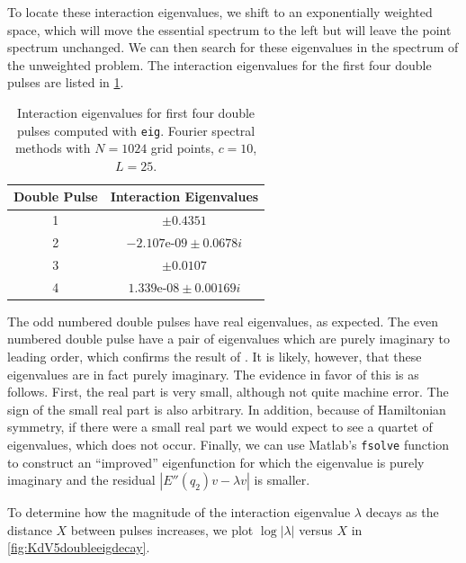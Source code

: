 \documentclass[thesis.tex]{subfiles}
\begin{document}
To locate these interaction eigenvalues, we shift to an exponentially weighted space, which will move the essential spectrum to the left but will leave the point spectrum unchanged. We can then search for these eigenvalues in the spectrum of the unweighted problem. The interaction eigenvalues for the first four double pulses are listed in \cref{table:KdV5inteigs}.

\begin{table}
\centering
\begin{tabular}{|c|c|} 
 \hline
 Double Pulse & Interaction Eigenvalues \\
 \hline
 1 & $\pm 0.4351$ \\
 2 & $-2.107\text{e-}09 \pm 0.0678 i$ \\
 3 & $\pm 0.0107$ \\
 4 & $1.339\text{e-}08 \pm 0.00169 i$ \\
 \hline
\end{tabular}
\caption{Interaction eigenvalues for first four double pulses computed with \texttt{eig}. Fourier spectral methods with $N = 1024$ grid points, $c = 10$, $L = 25$.}
\label{table:KdV5inteigs}
\end{table}

The odd numbered double pulses have real eigenvalues, as expected. The even numbered double pulse have a pair of eigenvalues which are purely imaginary to leading order, which confirms the result of \cite[Theorem 2.3]{Pelinovsky2007}. It is likely, however, that these eigenvalues are in fact purely imaginary. The evidence in favor of this is as follows. First, the real part is very small, although not quite machine error. The sign of the small real part is also arbitrary. In addition, because of Hamiltonian symmetry, if there were a small real part we would expect to see a quartet of eigenvalues, which does not occur. Finally, we can use Matlab's \texttt{fsolve} function to construct an ``improved'' eigenfunction for which the eigenvalue is purely imaginary and the residual $|E''(q_2)v - \lambda v|$ is smaller.

To determine how the magnitude of the interaction eigenvalue $\lambda$ decays as the distance $X$ between pulses increases, we plot $\log |\lambda|$ versus $X$ in \cref{fig:KdV5doubleeigdecay}. 
\end{document}
